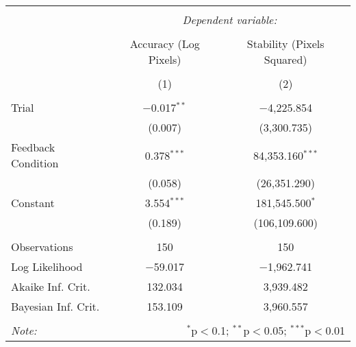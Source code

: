 
\begin{table}[!htbp] \centering 
  \caption{} 
  \label{} 
\begin{tabular}{@{\extracolsep{5pt}}lcc} 
\\[-1.8ex]\hline 
\hline \\[-1.8ex] 
 & \multicolumn{2}{c}{\textit{Dependent variable:}} \\ 
\cline{2-3} 
\\[-1.8ex] & Accuracy (Log Pixels) & Stability (Pixels Squared) \\ 
\\[-1.8ex] & (1) & (2)\\ 
\hline \\[-1.8ex] 
 Trial & $-$0.017$^{**}$ & $-$4,225.854 \\ 
  & (0.007) & (3,300.735) \\ 
  Feedback Condition & 0.378$^{***}$ & 84,353.160$^{***}$ \\ 
  & (0.058) & (26,351.290) \\ 
  Constant & 3.554$^{***}$ & 181,545.500$^{*}$ \\ 
  & (0.189) & (106,109.600) \\ 
 \hline \\[-1.8ex] 
Observations & 150 & 150 \\ 
Log Likelihood & $-$59.017 & $-$1,962.741 \\ 
Akaike Inf. Crit. & 132.034 & 3,939.482 \\ 
Bayesian Inf. Crit. & 153.109 & 3,960.557 \\ 
\hline 
\hline \\[-1.8ex] 
\textit{Note:}  & \multicolumn{2}{r}{$^{*}$p$<$0.1; $^{**}$p$<$0.05; $^{***}$p$<$0.01} \\ 
\end{tabular} 
\end{table} 
